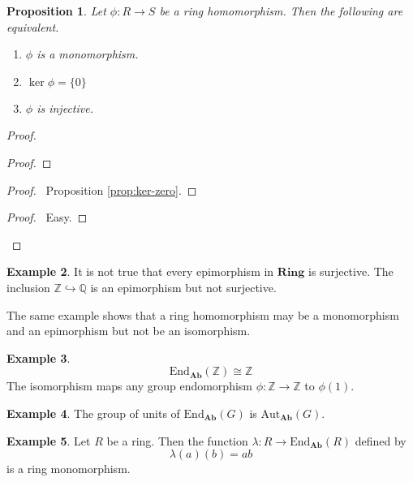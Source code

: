 \documentclass{book}
\let\qed\relax
\newtheorem{prop}{Proposition}[chapter]
\theoremstyle{definition}
\newtheorem{ex}[prop]{Example}
\newcommand{\Ab}{\ensuremath{\mathbf{Ab}}}
\newcommand{\Aut}[2]{\ensuremath{\mathrm{Aut}_{#1} \left( {#2} \right)}}
\newcommand{\End}[2]{\ensuremath{\mathrm{End}_{#1} \left( {#2} \right)}}
\newcommand{\Ring}{\ensuremath{\mathbf{Ring}}}
\begin{document}
\begin{prop}
Let $\phi : R \rightarrow S$ be a ring homomorphism. Then the following are equivalent.
\begin{enumerate}
\item $\phi$ is a monomorphism.
\item $\ker \phi = \{0\}$
\item $\phi$ is injective.
\end{enumerate}
\end{prop}

\begin{proof}
\pf
{}
\begin{proof}
\end{proof}
\begin{proof}
	\pf\ Proposition \ref{prop:ker-zero}.
\end{proof}
\begin{proof}
	\pf\ Easy.
\end{proof}
\qed
\end{proof}

\begin{ex}
It is not true that every epimorphism in $\Ring$ is surjective. The inclusion $\mathbb{Z} \hookrightarrow \mathbb{Q}$ is an epimorphism but not surjective.

The same example shows that a ring homomorphism may be a monomorphism and an epimorphism but not be an isomorphism.
\end{ex}

\begin{ex}
\[ \End{\Ab}{\mathbb{Z}} \cong \mathbb{Z} \]
The isomorphism maps any group endomorphism $\phi : \mathbb{Z} \rightarrow \mathbb{Z}$ to $\phi(1)$.
\end{ex}

\begin{ex}
The group of units of $\End{\Ab}{G}$ is $\Aut{\Ab}{G}$.
\end{ex}

\begin{ex}
Let $R$ be a ring. Then the function $\lambda : R \rightarrow \End{\Ab}{R}$ defined by
\[ \lambda(a)(b) = ab \]
is a ring monomorphism.
\end{ex}
 
\end{document}

